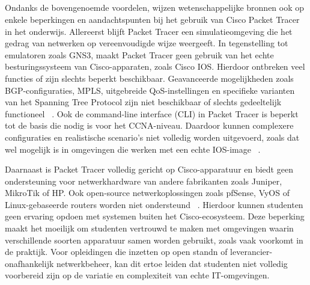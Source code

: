 \subsection{}
\label{sec:Beperkingen}

Ondanks de bovengenoemde voordelen, wijzen wetenschappelijke bronnen ook op enkele beperkingen en aandachtspunten bij het gebruik van Cisco Packet Tracer in het onderwijs. Allereerst blijft Packet Tracer een simulatieomgeving die het gedrag van netwerken op vereenvoudigde wijze weergeeft. In tegenstelling tot emulatoren zoals GNS3, maakt Packet Tracer geen gebruik van het echte besturingssysteem van Cisco-apparaten, zoals Cisco IOS. Hierdoor ontbreken veel functies of zijn slechts beperkt beschikbaar. Geavanceerde mogelijkheden zoals BGP-configuraties, MPLS, uitgebreide QoS-instellingen en specifieke varianten van het Spanning Tree Protocol zijn niet beschikbaar of slechts gedeeltelijk functioneel ~\autocite{Kuzmenko2016}. Ook de command-line interface (CLI) in Packet Tracer is beperkt tot de basis die nodig is voor het CCNA-niveau. Daardoor kunnen complexere configuraties en realistische scenario’s niet volledig worden uitgevoerd, zoals dat wel mogelijk is in omgevingen die werken met een echte IOS-image ~\autocite{Mwansa2024}.

\vspace{0.3cm}

Daarnaast is Packet Tracer volledig gericht op Cisco-apparatuur en biedt geen ondersteuning voor netwerkhardware van andere fabrikanten zoals Juniper, MikroTik of HP. Ook open-source netwerkoplossingen zoals pfSense, VyOS of Linux-gebaseerde routers worden niet ondersteund ~\autocite{Kuzmenko2016}. Hierdoor kunnen studenten geen ervaring opdoen met systemen buiten het Cisco-ecosysteem. Deze beperking maakt het moeilijk om studenten vertrouwd te maken met omgevingen waarin verschillende soorten apparatuur samen worden gebruikt, zoals vaak voorkomt in de praktijk. Voor opleidingen die inzetten op open standn of leverancier-onafhankelijk netwerkbeheer, kan dit ertoe leiden dat studenten niet volledig voorbereid zijn op de variatie en complexiteit van echte IT-omgevingen.

\vspace{0.3cm}


